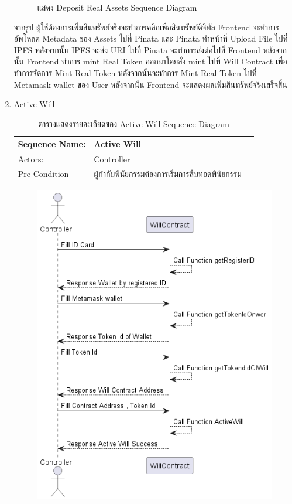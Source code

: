 \documentclass[12pt,oneside,openright,a4paper]{cpe-thai-project}
\begin{document}
\begin{enumerate}[label=\thesubsection.\arabic*,leftmargin=0pt,itemindent=1.25cm]
\begin{figure}[!thb]
			\caption{แสดง Deposit Real Assets Sequence Diagram}
		\end{figure}
		\FloatBarrier
	\tab จากรูป ผู้ใช้ต้องการเพิ่มสินทรัพย์จริงจะทำการคลิกเพื่อสินทรัพย์ดิจิทัล Frontend จะทำการอัพโหลด Metadata ของ Assets ไปที่ Pinata และ Pinata ทำหน้าที่ Upload File ไปที่ IPFS หลังจากนั้น IPFS จะส่ง URI ไปที่ Pinata จะทำการส่งต่อไปที่ Frontend หลังจากนั้น Frontend ทำการ mint Real Token ออกมาโดยสั่ง mint ไปที่ Will Contract เพื่อทำการจัดการ Mint Real Token หลังจากนั้นจะทำการ Mint Real Token ไปที่ Metamask wallet ของ User หลังจากนั้น Frontend จะแสดงผลเพิ่มสินทรัพย์จริงเสร็จสิ้น
\item Active Will
	\begin{table}[h]
\centering
\caption{ตารางแสดงรายละเอียดของ Active Will Sequence Diagram}
\begin{tabularx}{\textwidth}{|l|X|X|} 
\hline
Sequence Name: & Active Will                                          \\ 
\hline
Actors:        & Controller                                           \\ 
\hline
Pre-Condition  & ผู้กำกับพินัยกรรมต้องการเริ่มการสืบทอดพินัยกรรม  \\
\hline
\end{tabularx}
\end{table}
		\begin{figure}[!thb]
			\centering
			\includegraphics[scale=0.45]{activeWillseq}

\end{figure}
\end{enumerate}
\end{document}

